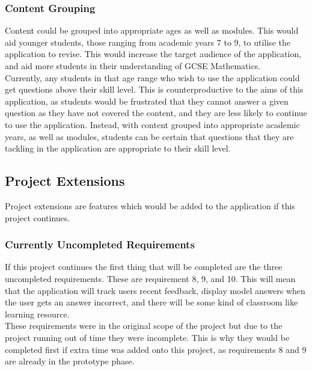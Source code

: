 \documentclass{article}
\begin{document}
\subsubsection{Content Grouping}

Content could be grouped into appropriate ages as well as modules. This would aid younger students, those ranging from academic years 7 to 9, to utilise the application to revise. This would increase the target audience of the application, and aid more students in their understanding of GCSE Mathematics. \\

Currently, any students in that age range who wish to use the application could get questions above their skill level. This is counterproductive to the aims of this application, as students would be frustrated that they cannot answer a given question as they have not covered the content, and they are less likely to continue to use the application. Instead, with content grouped into appropriate academic years, as well as modules, students can be certain that questions that they are tackling in the application are appropriate to their skill level. \\

\subsection{Project Extensions}

Project extensions are features which would be added to the application if this project continues. 

\subsubsection{Currently Uncompleted Requirements}

If this project continues the first thing that will be completed are the three uncompleted requirements. These are requirement 8, 9, and 10. This will mean that the application will track users recent feedback, display model answers when the user gets an answer incorrect, and there will be some kind of classroom like learning resource. \\

These requirements were in the original scope of the project but due to the project running out of time they were incomplete. This is why they would be completed first if extra time was added onto this project, as requirements 8 and 9 are already in the prototype phase. 
\end{document}
